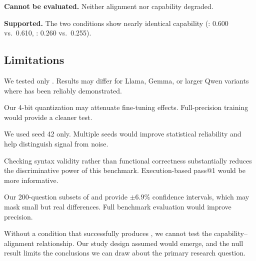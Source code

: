  \textbf{Cannot be evaluated.} Neither alignment nor capability degraded.

 \textbf{Supported.} The two conditions show nearly identical capability (\mmlu: 0.600 vs.\ 0.610, \gsmk: 0.260 vs.\ 0.255).

\subsection{Limitations}
\label{sec:limitations}

We tested only \qwen.
Results may differ for Llama, Gemma, or larger Qwen variants where \EM has been reliably demonstrated.

Our 4-bit quantization may attenuate fine-tuning effects.
Full-precision training would provide a cleaner test.

We used seed 42 only.
Multiple seeds would improve statistical reliability and help distinguish signal from noise.

Checking syntax validity rather than functional correctness substantially reduces the discriminative power of this benchmark.
Execution-based pass@1 would be more informative.

Our 200-question subsets of \mmlu and \gsmk provide $\pm$6.9\% confidence intervals, which may mask small but real differences.
Full benchmark evaluation would improve precision.

Without a condition that successfully produces \EM, we cannot test the capability--alignment relationship.
Our study design assumed \EM would emerge, and the null result limits the conclusions we can draw about the primary research question.
